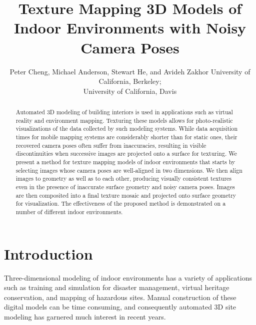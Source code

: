 \documentclass[]{spie}  %
\title{Texture Mapping 3D Models of Indoor Environments with Noisy Camera Poses}
\author{Peter Cheng\supit{a}, Michael Anderson\supit{a}, Stewart He\supit{b}, and Avideh Zakhor\supit{a}
\skiplinehalf
\supit{a}University of California, Berkeley; \\
\supit{b}University of California, Davis
}
\begin{document}
\maketitle

\begin{abstract}
  Automated 3D modeling of building interiors is used in applications
  such as virtual reality and environment mapping. Texturing these
  models allows for photo-realistic visualizations of the data
  collected by such modeling systems. While data acquisition times for
  mobile mapping systems are considerably shorter than for static
  ones, their recovered camera poses often suffer from inaccuracies,
  resulting in visible discontinuities when successive images are
  projected onto a surface for texturing. We present a method for
  texture mapping models of indoor environments that starts by
  selecting images whose camera poses are well-aligned in two
  dimensions. We then align images to geometry as well as to each
  other, producing visually consistent textures even in the presence
  of inaccurate surface geometry and noisy camera poses. Images are
  then composited into a final texture mosaic and projected onto
  surface geometry for visualization. The effectiveness of the
  proposed method is demonstrated on a number of different indoor
  environments.
\end{abstract}



\section{Introduction}
\label{sec:introduction} %
Three-dimensional modeling of indoor environments has a variety of
applications such as training and simulation for disaster management,
virtual heritage conservation, and mapping of hazardous sites. Manual
construction of these digital models can be time consuming, and
consequently automated 3D site modeling has garnered much interest in
recent years.
\end{document}
